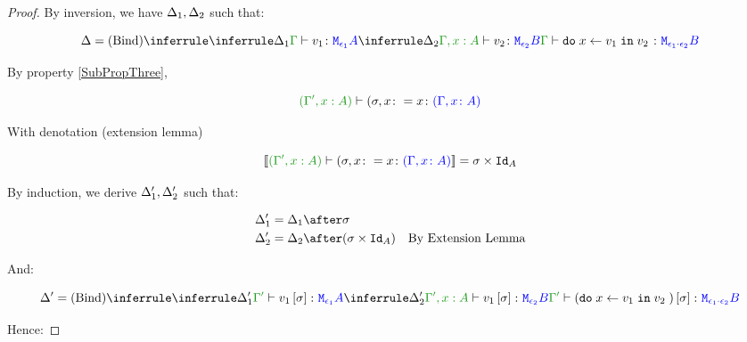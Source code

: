 \documentclass{report}
\begin{document}
\begin{framed}
\begin{proof}
        
        
        By inversion, we have $\Delta_1, \Delta_2$ such that:
        
        \begin{equation}
            \D = \ntreeruleII{Bind}{
                \treeruleI{\D_1}{\typerelation{\G}{v_1}{\M{\e_1}{A}}}
                }{
                \treeruleI{\D_2}{\typerelation{\G, x:A }{v_2}{\M{\e_2}{B}}}
            }{
                \typerelation{\G}{\doin{x}{v_1}{v_2}}{\M{\e_1\dot\e_2}{B}}
            }
        \end{equation}
        
        By property \ref{SubPropThree},
        
        \begin{equation}
            \typerelation{(\G', x:A)}{(\si, x\setto x}{(\gax)}
        \end{equation}
        
        With denotation (extension lemma)
        
        \begin{equation}
            \deno{\typerelation{(\G', x:A)}{(\si, x\setto x}{(\gax)}} = \si\times\Id{A}
        \end{equation}
        
        By induction, we derive $\Delta_1', \Delta_2'$ such that:
        
        \begin{align*}
            \D_1' & = \D_1\after \si\\
            \D_2' & = \D_2\after (\si\times\Id{A})\qt{By Extension Lemma}
        \end{align*}
        
        And:
        
        \begin{equation}
            \D' = \ntreeruleII{Bind}{
                \treeruleI{\D_1'}{\typerelation{\G'}{v_1\ssi}{\M{\e_1}{A}}}
                }{
                \treeruleI{\D_2'}{\typerelation{\G', x:A }{v_1\ssi}{\M{\e_2}{B}}}
            }{
                \typerelation{\G'}{(\doin{x}{v_1}{v_2})\ssi}{\M{\e_1\dot\e_2}{B}}
            }
        \end{equation}
        
        Hence:
        

\end{proof}
\end{framed}
\end{document}
